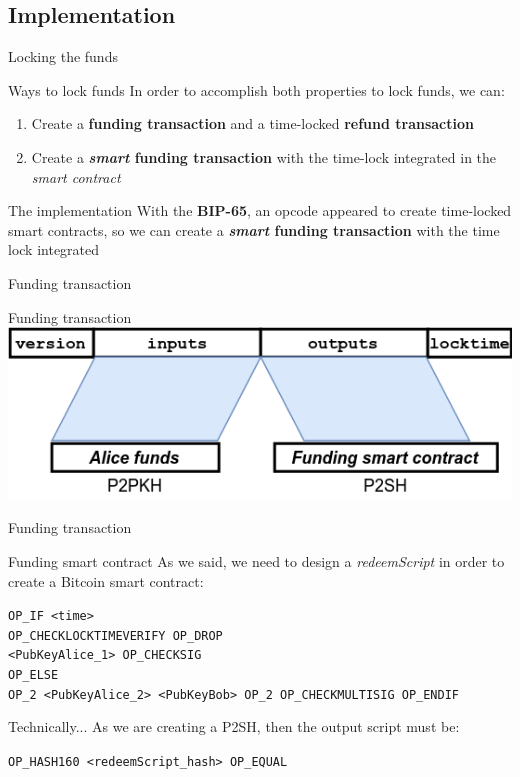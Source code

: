 \documentclass{beamer}
\begin{document}
\subsection{Implementation}
\begin{frame}{Locking the funds}
 \begin{block}{Ways to lock funds}
  In order to accomplish both properties to lock funds, we can:
  \begin{enumerate}
   \item Create a \textbf{funding transaction} and a time-locked \textbf{refund transaction}
   \item Create a \textbf{\textit{smart} funding transaction} with
         the time-lock integrated in the \textit{smart contract}
  \end{enumerate}
 \end{block}
 \pause
 \begin{block}{The implementation}
  With the \textbf{BIP-65}, an opcode appeared to create time-locked smart contracts, so we can create a \textbf{\textit{smart} funding transaction} with the time lock integrated
 \end{block}
\end{frame}
\begin{frame}{Funding transaction}
 \begin{exampleblock}{Funding transaction}
  \includegraphics[width=\textwidth, height=0.8\textheight, keepaspectratio]{img/unidir_tx_funding.png}
 \end{exampleblock}
 \pause
\end{frame}
\begin{frame}{Funding transaction}
 \begin{exampleblock}{Funding smart contract}
  As we said, we need to design a \textit{redeemScript} in order to create a Bitcoin smart contract:
  \pause
  \begin{center}
   \texttt{OP\_IF <time>}\\
   \texttt{OP\_CHECKLOCKTIMEVERIFY OP\_DROP}\\
   \texttt{<PubKeyAlice\_1> OP\_CHECKSIG}\\
   \texttt{OP\_ELSE}\\
   \texttt{OP\_2 <PubKeyAlice\_2> <PubKeyBob> OP\_2 OP\_CHECKMULTISIG OP\_ENDIF}
  \end{center}
 \end{exampleblock}
 \pause
 \begin{exampleblock}{Technically...}
  As we are creating a P2SH, then the output script must be:\
  \begin{center}
   \texttt{OP\_HASH160 <redeemScript\_hash> OP\_EQUAL}
  \end{center}
 \end{exampleblock}
\end{frame}
\end{document}

